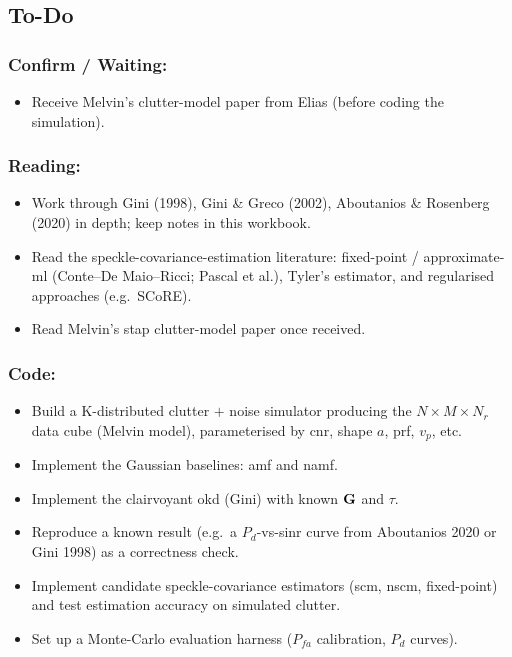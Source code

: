 \documentclass{article}
\begin{document}
\subsection{To-Do}
\subsubsection{Confirm / Waiting:}
\begin{itemize}
    \item Receive Melvin's clutter-model paper from Elias (before coding the simulation).
\end{itemize}

\subsubsection{Reading:}
\begin{itemize}
    \item Work through Gini (1998), Gini \& Greco (2002), Aboutanios \& Rosenberg (2020) in depth; keep notes in this workbook.
    \item Read the speckle-covariance-estimation literature: fixed-point / approximate-\gls{ml} (Conte--De Maio--Ricci; Pascal et al.), Tyler's estimator, and regularised approaches (e.g.\ SCoRE).
    \item Read Melvin's \gls{stap} clutter-model paper once received.
\end{itemize}

\subsubsection{Code:}
\begin{itemize}
    \item Build a K-distributed clutter $+$ noise simulator producing the $N\times M\times N_r$ data cube (Melvin model), parameterised by \gls{cnr}, shape $a$, \gls{prf}, $v_p$, etc.
    \item Implement the Gaussian baselines: \gls{amf} and \gls{namf}.
    \item Implement the clairvoyant \gls{okd} (Gini) with known $\mathbf{G}$ and $\tau$.
    \item Reproduce a known result (e.g.\ a $P_d$-vs-\gls{sinr} curve from Aboutanios 2020 or Gini 1998) as a correctness check.
    \item Implement candidate speckle-covariance estimators (\gls{scm}, \gls{nscm}, fixed-point) and test estimation accuracy on simulated clutter.
    \item Set up a Monte-Carlo evaluation harness ($P_{fa}$ calibration, $P_d$ curves).
\end{itemize}
\end{document}
